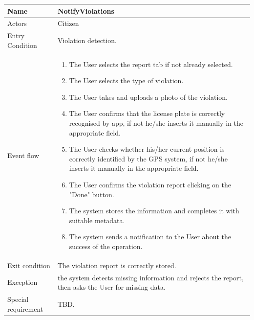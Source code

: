 \begin{tabular}{|p{3.7cm}|p{11cm}|}
\hline
Name & NotifyViolations\\
\hline
Actors & Citizen\\
\hline
Entry Condition & Violation detection.\\
\hline
Event flow & \begin{enumerate}
                \item The User selects the report tab if not already selected.
                \item The User selects the type of violation.
                \item The User takes and uploads a photo of the violation.
                \item The User confirms that the license plate is correctly recognised by app, if not he/she inserts it manually in the appropriate field.
                \item The User checks whether his/her current position is correctly identified by the GPS system, if not he/she inserts it manually in the appropriate field.
                \item The User confirms the violation report clicking on the "Done" button.
                \item The system stores the information and completes it with suitable metadata.
                \item The system sends a notification to the User about the success of the operation.
            \end{enumerate}\\
\hline
Exit condition & The violation report is correctly stored.\\
\hline
Exception & the system detects missing information and rejects the report, then asks the User for missing data.\\
\hline
Special requirement & TBD.\\
\hline
\end{tabular}

